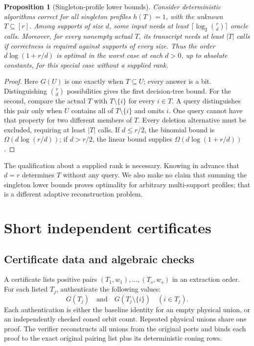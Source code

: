 \documentclass[11pt]{article}
\newtheorem{proposition}[theorem]{Proposition}
\theoremstyle{definition}
\begin{document}
\begin{proposition}[Singleton-profile lower bounds]
\label{prop:lower}
Consider deterministic algorithms correct for all singleton profiles
$h(T)=1$, with the unknown $T\subseteq[r]$. Among supports of size $d$,
some input needs at least $\lceil\log_2\binom rd\rceil$ oracle calls.
Moreover, for every nonempty actual $T$, its transcript needs at least
$|T|$ calls if correctness is required against supports of every size.
Thus the order $d\log(1+r/d)$ is optimal in the worst case at each $d>0$,
up to absolute constants, for this special case without a supplied rank.
\end{proposition}
\begin{proof}
Here $G(U)$ is one exactly when $T\subseteq U$; every answer is a bit.
Distinguishing $\binom rd$ possibilities gives the first decision-tree bound.
For the second, compare the actual $T$ with $T\setminus\{i\}$ for every
$i\in T$. A query distinguishes this pair only when $U$ contains all of
$T\setminus\{i\}$ and omits $i$. One query cannot have that property for
two different members of $T$. Every deletion alternative must be
excluded, requiring at least $|T|$ calls. If $d\leq r/2$, the binomial
bound is $\Omega(d\log(r/d))$; if $d>r/2$, the linear bound supplies
$\Omega(d\log(1+r/d))$.
\end{proof}

The qualification about a supplied rank is necessary. Knowing in advance
that $d=r$ determines $T$ without any query. We also make no claim that
summing the singleton lower bounds proves optimality for arbitrary
multi-support profiles; that is a different adaptive reconstruction problem.

\section{Short independent certificates}
\label{sec:certificates}

\subsection{Certificate data and algebraic checks}
A certificate lists positive pairs $(T_1,w_1),\ldots,(T_s,w_s)$ in an
extraction order. For each listed $T_j$, authenticate the following values:
\begin{equation}
 G(T_j)\quad\text{and}\quad G(T_j\setminus\{i\})\quad(i\in T_j).
 \label{eq:certificate-queries}
\end{equation}
Each authentication is either the baseline identity for an empty physical
union, or an independently checked coned orbit count. Repeated physical
unions share one proof. The verifier reconstructs all unions from the
original ports and binds each proof to the exact original pairing list plus
its deterministic coning rows.
\end{document}
